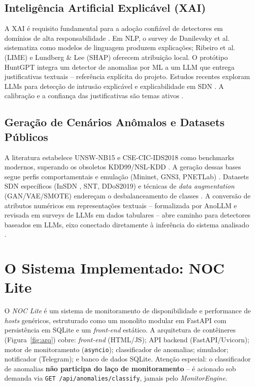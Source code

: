 \documentclass[12pt,a4paper]{article}
\begin{document}
\subsection{Inteligência Artificial Explicável (XAI)}
\label{sec:xai}

A XAI é requisito fundamental para a adoção confiável de detectores em domínios
de alta responsabilidade \cite{rA52}\cite{rA531}\cite{rA517}. Em NLP, o survey de Danilevsky et
al. \cite{rA51} sistematiza como modelos de linguagem produzem explicações; Ribeiro
et al. \cite{rA53} (LIME) e Lundberg \& Lee \cite{rA54} (SHAP) oferecem atribuição local.
O protótipo HuntGPT \cite{rA511} integra um detector de anomalias por ML a um LLM
que entrega justificativas textuais -- referência explícita do projeto. Estudos
recentes exploram LLMs para detecção de intrusão explicável \cite{rA520}\cite{rA521} e
explicabilidade em SDN \cite{rA522}. A calibração e a confiança das justificativas
são temas ativos \cite{rA531}\cite{rA532}\cite{rA533}\cite{rA534}.

\subsection{Geração de Cenários Anômalos e Datasets Públicos}
\label{sec:datasets}

A literatura estabelece UNSW-NB15 \cite{rA61}\cite{rA62} e CSE-CIC-IDS2018 \cite{rA63}\cite{rA64} como
benchmarks modernos, superando os obsoletos KDD99/NSL-KDD \cite{rA65}\cite{rA66}. A
geração dessas bases segue perfis comportamentais e emulação (Mininet,
GNS3, PNETLab) \cite{rA69}\cite{rA627}\cite{rA628}\cite{rA629}. Datasets SDN específicos (InSDN
\cite{rA610}, SNT, DDoS2019) e técnicas de \textit{data augmentation} (GAN/VAE/SMOTE)
endereçam o desbalanceamento de classes \cite{rA614}\cite{rA615}\cite{rA623}. A conversão de
atributos numéricos em representações textuais -- formalizada por AnoLLM
\cite{rA616} e revisada em surveys de LLMs em dados tabulares \cite{rA617}\cite{rA618} -- abre
caminho para detectores baseados em LLMs, eixo conectado diretamente à
inferência do sistema analisado \cite{rA630}.

\section{O Sistema Implementado: NOC Lite}
\label{sec:sistema}

O \textit{NOC Lite} é um sistema de monitoramento de disponibilidade e
performance de \textit{hosts} genéricos, estruturado como um monolito modular em
FastAPI com persistência em SQLite e um \textit{front-end} estático. A
arquitetura de contêineres (Figura~\ref{fig:arq}) cobre: \textit{front-end}
(HTML/JS); API backend (FastAPI/Uvicorn); motor de monitoramento
(\texttt{asyncio}); classificador de anomalias; simulador; notificador
(Telegram); e banco de dados SQLite. Atenção especial: o classificador de
anomalias \textbf{não participa do laço de monitoramento} -- é acionado sob
demanda via \texttt{GET /api/anomalies/classify}, jamais pelo
\textit{MonitorEngine}.
\end{document}
